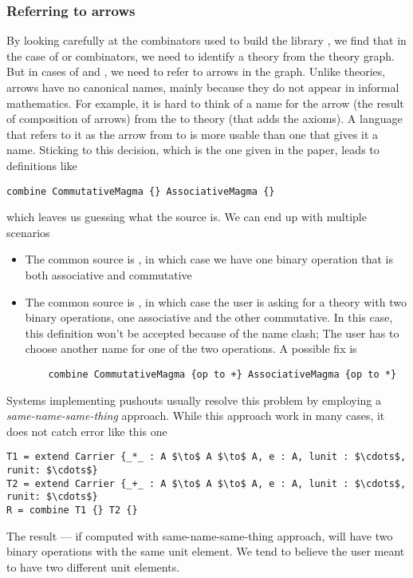 \subsubsection{Referring to arrows}
By looking carefully at the combinators used to build the library , we find that in the case of  or  combinators, we need to identify a theory from the theory graph. But in cases of  and , we need to refer to arrows in the graph. Unlike theories, arrows have no canonical names, mainly because they do not appear in informal mathematics. For example, it is hard to think of a name for the arrow (the result of composition of arrows) from the  to  theory (that adds the axioms). A language that refers to it as the arrow from  to  is more usable than one that gives it a name. Sticking to this decision, which is the one given in the paper, leads to definitions like 
\begin{lstlisting}
combine CommutativeMagma {} AssociativeMagma {}
\end{lstlisting}
which leaves us guessing what the source is. We can end up with multiple scenarios 
\begin{itemize}
    \item The common source is , in which case we have one binary operation that is both associative and commutative 
    \item The common source is , in which case the user is asking for a theory with two binary operations, one associative and the other commutative. In this case, this definition won't be accepted because of the name clash; The user has to choose another name for one of the two operations. A possible fix is 
    \begin{lstlisting}
    combine CommutativeMagma {op to +} AssociativeMagma {op to *}
    \end{lstlisting}
\end{itemize}

Systems implementing pushouts usually resolve this problem by employing a \emph{same-name-same-thing} approach. While this approach work in many cases, it does not catch error like this one 
\begin{lstlisting}[mathescape]
T1 = extend Carrier {_*_ : A $\to$ A $\to$ A, e : A, lunit : $\cdots$, runit: $\cdots$}
T2 = extend Carrier {_+_ : A $\to$ A $\to$ A, e : A, lunit : $\cdots$, runit: $\cdots$}
R = combine T1 {} T2 {}     
\end{lstlisting}
The result  --- if computed with same-name-same-thing approach, will have two binary operations with the same unit element. We tend to believe the user meant to have two different unit elements. 

